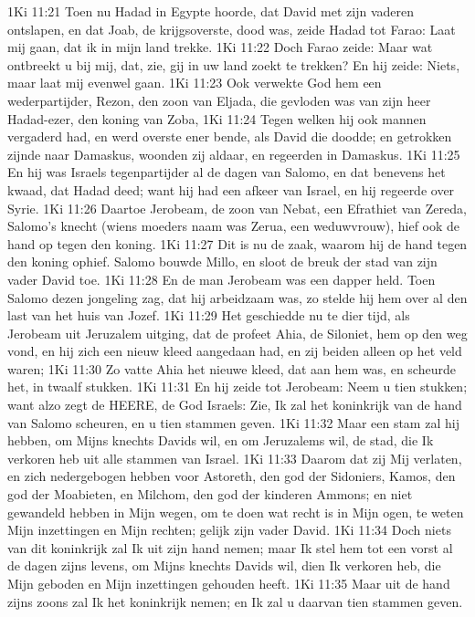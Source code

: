1Ki 11:21  Toen nu Hadad in Egypte hoorde, dat David met zijn vaderen ontslapen, en dat Joab, de krijgsoverste, dood was, zeide Hadad tot Farao: Laat mij gaan, dat ik in mijn land trekke.
1Ki 11:22  Doch Farao zeide: Maar wat ontbreekt u bij mij, dat, zie, gij in uw land zoekt te trekken? En hij zeide: Niets, maar laat mij evenwel gaan.
1Ki 11:23  Ook verwekte God hem een wederpartijder, Rezon, den zoon van Eljada, die gevloden was van zijn heer Hadad-ezer, den koning van Zoba,
1Ki 11:24  Tegen welken hij ook mannen vergaderd had, en werd overste ener bende, als David die doodde; en getrokken zijnde naar Damaskus, woonden zij aldaar, en regeerden in Damaskus.
1Ki 11:25  En hij was Israels tegenpartijder al de dagen van Salomo, en dat benevens het kwaad, dat Hadad deed; want hij had een afkeer van Israel, en hij regeerde over Syrie.
1Ki 11:26  Daartoe Jerobeam, de zoon van Nebat, een Efrathiet van Zereda, Salomo's knecht (wiens moeders naam was Zerua, een weduwvrouw), hief ook de hand op tegen den koning.
1Ki 11:27  Dit is nu de zaak, waarom hij de hand tegen den koning ophief. Salomo bouwde Millo, en sloot de breuk der stad van zijn vader David toe.
1Ki 11:28  En de man Jerobeam was een dapper held. Toen Salomo dezen jongeling zag, dat hij arbeidzaam was, zo stelde hij hem over al den last van het huis van Jozef.
1Ki 11:29  Het geschiedde nu te dier tijd, als Jerobeam uit Jeruzalem uitging, dat de profeet Ahia, de Siloniet, hem op den weg vond, en hij zich een nieuw kleed aangedaan had, en zij beiden alleen op het veld waren;
1Ki 11:30  Zo vatte Ahia het nieuwe kleed, dat aan hem was, en scheurde het, in twaalf stukken.
1Ki 11:31  En hij zeide tot Jerobeam: Neem u tien stukken; want alzo zegt de HEERE, de God Israels: Zie, Ik zal het koninkrijk van de hand van Salomo scheuren, en u tien stammen geven.
1Ki 11:32  Maar een stam zal hij hebben, om Mijns knechts Davids wil, en om Jeruzalems wil, de stad, die Ik verkoren heb uit alle stammen van Israel.
1Ki 11:33  Daarom dat zij Mij verlaten, en zich nedergebogen hebben voor Astoreth, den god der Sidoniers, Kamos, den god der Moabieten, en Milchom, den god der kinderen Ammons; en niet gewandeld hebben in Mijn wegen, om te doen wat recht is in Mijn ogen, te weten Mijn inzettingen en Mijn rechten; gelijk zijn vader David.
1Ki 11:34  Doch niets van dit koninkrijk zal Ik uit zijn hand nemen; maar Ik stel hem tot een vorst al de dagen zijns levens, om Mijns knechts Davids wil, dien Ik verkoren heb, die Mijn geboden en Mijn inzettingen gehouden heeft.
1Ki 11:35  Maar uit de hand zijns zoons zal Ik het koninkrijk nemen; en Ik zal u daarvan tien stammen geven.
